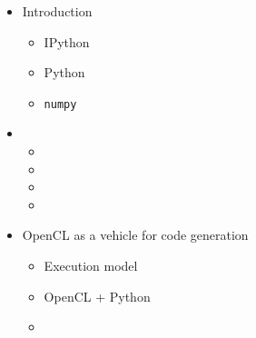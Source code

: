 \documentclass[english,compress]{beamer}
\begin{document}
\begin{frame}
  \begin{columns}
    \begin{itemize}
    \setlength{\itemsep}{0.0in}
    \item Introduction
      \begin{itemize}
        \item IPython
        \item Python
        \item \texttt{numpy}
      \end{itemize}
    \item {}
      \begin{itemize}
        \item {}
        \item {}
        \item {}
        \item {}
      \end{itemize}
    \item OpenCL as a vehicle for code generation
      \begin{itemize}
        \item Execution model
        \item OpenCL + Python
        \item {}
      \end{itemize}
    \end{itemize}


\end{columns}
\end{frame}
\end{document}

